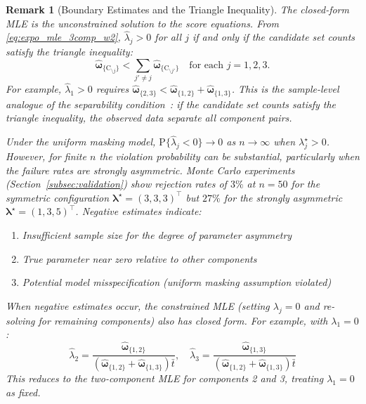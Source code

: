 \documentclass[pdflatex,sn-mathphys-num,Numbered]{sn-jnl}
\newcommand{\RV}[1]{\mathrm{#1}}
\newcommand{\Prob}[1]{\mathrm{P}\{#1\}}
\newcommand{\cand}{\RV{C}}         %
\newcommand{\tparam}[1]{{#1}^{\star}}  %
\newcommand{\estimator}[1]{\hat{#1}}   %
\newcommand{\cntsymb}{\boldsymbol{\hat\omega}}
\newcommand{\cnt}[1]{\cntsymb_{\{#1\}}}
\renewcommand{\vec}[1]{\boldsymbol{#1}}
\theoremstyle{thmstyleone}
\theoremstyle{thmstylethree}
\theoremstyle{thmstyletwo}
\newtheorem{remark}[theorem]{Remark}
\begin{document}
\begin{remark}[Boundary Estimates and the Triangle Inequality]
\label{rem:boundary_estimates}
The closed-form MLE is the unconstrained solution to the score equations. From \eqref{eq:expo_mle_3comp_w2}, $\estimator{\lambda}_j > 0$ for all $j$ if and only if the candidate set counts satisfy the \emph{triangle inequality}:
\begin{equation}
\label{eq:triangle_ineq}
\cnt{\cand_{\setminus j}} < \sum_{j' \neq j} \cnt{\cand_{\setminus j'}} \quad \text{for each } j = 1, 2, 3.
\end{equation}
For example, $\estimator{\lambda}_1 > 0$ requires $\cnt{2,3} < \cnt{1,2} + \cnt{1,3}$. This is the sample-level analogue of the separability condition~\cite{towell2025masked}: if the candidate set counts satisfy the triangle inequality, the observed data separate all component pairs.

Under the uniform masking model, $\Prob{\estimator{\lambda}_j < 0} \to 0$ as $n \to \infty$ when $\tparam{\lambda}_j > 0$. However, for finite $n$ the violation probability can be substantial, particularly when the failure rates are strongly asymmetric. Monte Carlo experiments (Section~\ref{subsec:validation}) show rejection rates of $3\%$ at $n=50$ for the symmetric configuration $\tparam{\vec{\lambda}} = (3,3,3)^\top$ but $27\%$ for the strongly asymmetric $\tparam{\vec{\lambda}} = (1,3,5)^\top$. Negative estimates indicate:
\begin{enumerate}
\item Insufficient sample size for the degree of parameter asymmetry
\item True parameter near zero relative to other components
\item Potential model misspecification (uniform masking assumption violated)
\end{enumerate}

When negative estimates occur, the constrained MLE (setting $\lambda_j = 0$ and re-solving for remaining components) also has closed form. For example, with $\lambda_1 = 0$:
\begin{equation}
\estimator{\lambda}_2 = \frac{\cnt{1,2}}{(\cnt{1,2} + \cnt{1,3})\bar{t}}, \quad
\estimator{\lambda}_3 = \frac{\cnt{1,3}}{(\cnt{1,2} + \cnt{1,3})\bar{t}}
\end{equation}
This reduces to the two-component MLE for components 2 and 3, treating $\lambda_1 = 0$ as fixed.
\end{remark}
\end{document}
